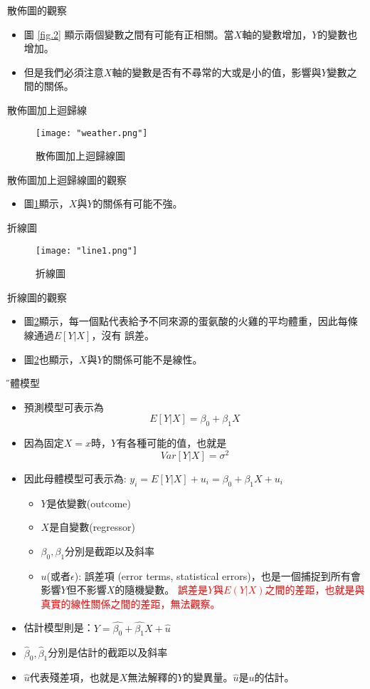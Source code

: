 \documentclass[xcolor=dvipsnames]{beamer}
\begin{document}
\begin{frame}{散佈圖的觀察}
\begin{itemize}
\item 圖 \ref{fig.2} 顯示兩個變數之間有可能有正相關。當$X$軸的變數增加，$Y$的變數也增加。
\item 但是我們必須注意$X$軸的變數是否有不尋常的大或是小的值，影響與$Y$變數之間的關係。
\end{itemize}
\end{frame}
\begin{frame}{散佈圖加上迴歸線}
\begin{figure}
\texttt{[image: "weather.png"]}
\caption{散佈圖加上迴歸線圖}
\label{fig.3}
\end{figure}
\end{frame}
\begin{frame}{散佈圖加上迴歸線圖的觀察}
\begin{itemize}
\item 圖\ref{fig.3}顯示，$X$與$Y$的關係有可能不強。
\end{itemize}
\end{frame}
\begin{frame}{折線圖}
\begin{figure}
\texttt{[image: "line1.png"]}
\caption{折線圖}
\label{fig.4}
\end{figure}
\end{frame}
\begin{frame}{折線圖的觀察}
\begin{itemize}
\item 圖\ref{fig.4}顯示，每一個點代表給予不同來源的蛋氨酸的火雞的平均體重，因此每條線通過$E[Y|X]$，沒有
誤差。
\item 圖\ref{fig.4}也顯示，$X$與$Y$的關係可能不是線性。
\end{itemize}
\end{frame}
\begin{frame}{\H 母體模型}
\begin{itemize}
\item 預測模型可表示為 
\[ E[Y|X]=\beta_{0}+\beta_{1}X \]
\item 因為固定$X=x$時，$Y$有各種可能的值，也就是
\[Var[Y|X]=\sigma^2 \]
\item 因此母體模型可表示為: $y_{i}=E[Y|X]+u_{i}=\beta_{0}+\beta_{1}X+u_{i} $
\begin{itemize}
\item $Y$是依變數(outcome)
\item $X$是自變數(regressor)
\item $\beta_{0},\beta_{1}  $分別是截距以及斜率
\item $u$(或者$\epsilon$): 誤差項 (error terms, statistical errors)，也是一個捕捉到所有會影響$Y$但不影響$X$的隨機變數。
\textcolor{red}{\K 誤差是$Y$與$E(Y|X)$之間的差距，也就是與真實的線性關係之間的差距，無法觀察。}
\end{itemize}
\item 估計模型則是：$Y=\hat{\beta_{0}}+\hat{\beta_{1}}X+\hat{u}  $
\item $\hat{\beta}_{0},\hat{\beta}_{1}  $分別是估計的截距以及斜率
\item $\hat{u}$代表殘差項，也就是$X$無法解釋的$Y$的變異量。$\hat{u}$是$u$的估計。
\end{itemize}
\end{frame}
\end{document}
